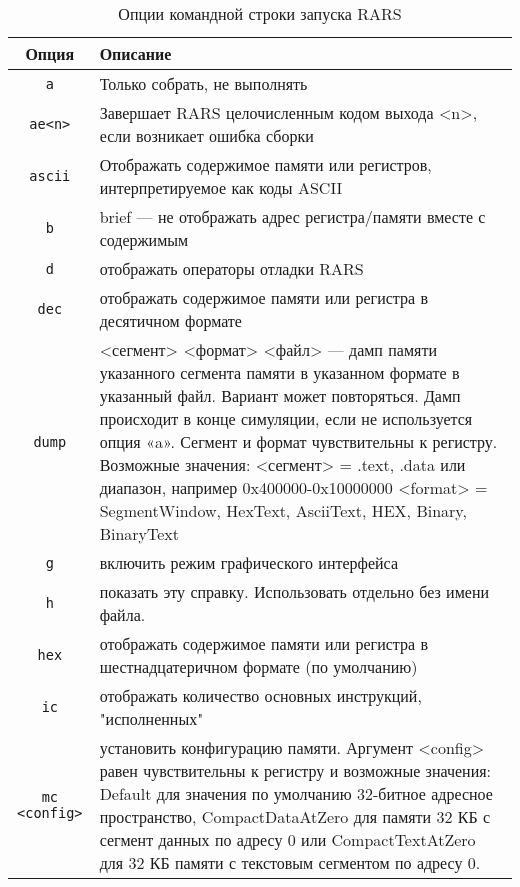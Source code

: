 \begin{table}[h]
    \caption{Опции командной строки запуска RARS}
    \centering
    \begin{tabularx}{\textwidth}{|c|X|}
        \hline
        \textbf{Опция} & \textbf{Описание} \\
        \hline \hline
        \texttt{а} & Только собрать, не выполнять \\
        \hline
        \texttt{ae<n>} & Завершает RARS целочисленным кодом выхода <n>, если возникает ошибка сборки \\
        \hline
        \texttt{ascii} & Отображать содержимое памяти или регистров, интерпретируемое как коды ASCII \\
        \hline
        \texttt{b} & brief --- не отображать адрес регистра/памяти вместе с содержимым \\
        \hline
        \texttt{d} & отображать операторы отладки RARS \\
        \hline
        \texttt{dec} & отображать содержимое памяти или регистра в десятичном формате \\
        \hline
        \texttt{dump} &  <сегмент> <формат> <файл> --- дамп памяти указанного сегмента памяти в указанном формате в указанный файл. Вариант может повторяться.
        Дамп происходит в конце симуляции, если не используется опция «a».
        Сегмент и формат чувствительны к регистру. Возможные значения:
        <сегмент> = .text, .data или диапазон, например 0x400000-0x10000000
        <format> = SegmentWindow, HexText, AsciiText, HEX, Binary, BinaryText \\
        \hline
        \texttt{g} & включить режим графического интерфейса \\
        \hline
        \texttt{h} & показать эту справку. Использовать отдельно без имени файла. \\
        \hline
        \texttt{hex} & отображать содержимое памяти или регистра в шестнадцатеричном формате (по умолчанию) \\
        \hline
        \texttt{ic} & отображать количество основных инструкций, "исполненных" \\
        \hline
        \texttt{mc <config>} & установить конфигурацию памяти. Аргумент <config> равен чувствительны к регистру и возможные значения: Default для значения по умолчанию 32-битное адресное пространство, CompactDataAtZero для памяти 32 КБ с сегмент данных по адресу 0 или CompactTextAtZero для 32 КБ
        памяти с текстовым сегментом по адресу 0. \\

\end{tabularx}
\end{table}
